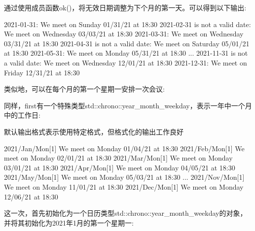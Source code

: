 通过使用成员函数ok()，将无效日期调整为下个月的第一天。可以得到以下输出:

\begin{shell}
2021-01-31:
 We meet on Sunday 01/31/21 at 18:30
2021-02-31 is not a valid date:
 We meet on Wednesday 03/03/21 at 18:30
2021-03-31:
 We meet on Wednesday 03/31/21 at 18:30
2021-04-31 is not a valid date:
 We meet on Saturday 05/01/21 at 18:30
2021-05-31:
 We meet on Monday 05/31/21 at 18:30
...
2021-11-31 is not a valid date:
 We meet on Wednesday 12/01/21 at 18:30
2021-12-31:
 We meet on Friday 12/31/21 at 18:30
\end{shell}


类似地，可以在每个月的第一个星期一安排一次会议:



同样，first有一个特殊类型std::chrono::year\_month\_weekday，表示一年中一个月中的工作日:

默认输出格式表示使用特定格式，但格式化的输出工作良好

\begin{shell}
2021/Jan/Mon[1]
 We meet on Monday 01/04/21 at 18:30
2021/Feb/Mon[1]
 We meet on Monday 02/01/21 at 18:30
2021/Mar/Mon[1]
 We meet on Monday 03/01/21 at 18:30
2021/Apr/Mon[1]
 We meet on Monday 04/05/21 at 18:30
2021/May/Mon[1]
 We meet on Monday 05/03/21 at 18:30
...
2021/Nov/Mon[1]
 We meet on Monday 11/01/21 at 18:30
2021/Dec/Mon[1]
 We meet on Monday 12/06/21 at 18:30
\end{shell}


这一次，首先初始化为一个日历类型std::chrono::year\_month\_weekday的对象，并将其初始化为2021年1月的第一个星期一:


